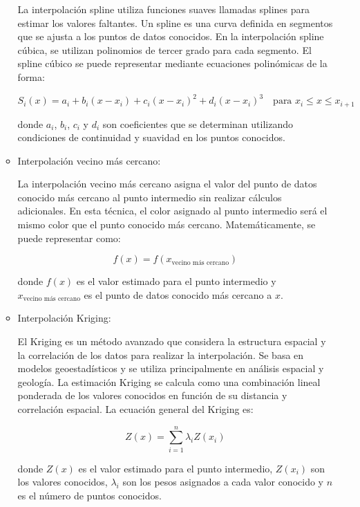 \documentclass{article}
\begin{document}
\begin{itemize}
\begin{itemize}
La interpolación spline utiliza funciones suaves llamadas splines para estimar los valores faltantes. Un spline es una curva definida en segmentos que se ajusta a los puntos de datos conocidos. En la interpolación spline cúbica, se utilizan polinomios de tercer grado para cada segmento. El spline cúbico se puede representar mediante ecuaciones polinómicas de la forma:

\begin{equation}
    S_i(x) = a_i + b_i(x - x_i) + c_i(x - x_i)^2 + d_i(x - x_i)^3 \quad \textrm{para } x_i \leq x \leq x_{i+1}
\end{equation}

donde $a_i$, $b_i$, $c_i$ y $d_i$ son coeficientes que se determinan utilizando condiciones de continuidad y suavidad en los puntos conocidos.

\item Interpolación vecino más cercano:

La interpolación vecino más cercano asigna el valor del punto de datos conocido más cercano al punto intermedio sin realizar cálculos adicionales. En esta técnica, el color asignado al punto intermedio será el mismo color que el punto conocido más cercano. Matemáticamente, se puede representar como:

\begin{equation}
    f(x) = f(x_{\textrm{vecino más cercano}})
\end{equation}

donde $f(x)$ es el valor estimado para el punto intermedio y $x_{\textrm{vecino más cercano}}$ es el punto de datos conocido más cercano a $x$.

\item Interpolación Kriging:

El Kriging es un método avanzado que considera la estructura espacial y la correlación de los datos para realizar la interpolación. Se basa en modelos geoestadísticos y se utiliza principalmente en análisis espacial y geología. La estimación Kriging se calcula como una combinación lineal ponderada de los valores conocidos en función de su distancia y correlación espacial. La ecuación general del Kriging es:

\begin{equation}
    Z(x) = \sum_{i=1}^{n} \lambda_i Z(x_i)
\end{equation}

donde $Z(x)$ es el valor estimado para el punto intermedio, $Z(x_i)$ son los valores conocidos, $\lambda_i$ son los pesos asignados a cada valor conocido y $n$ es el número de puntos conocidos.
\end{itemize}


\end{itemize}
\end{document}
